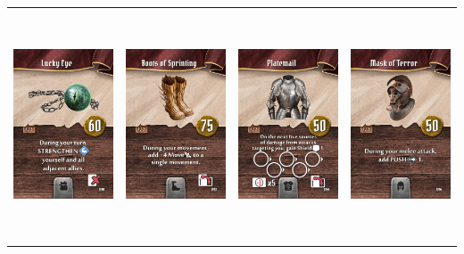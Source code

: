 \documentclass{minimal}
\begin{document}
{\begin{longtable}{llll}
\includegraphics[width=44mm,height=68mm]{./57-63/gh-063-lucky-eye.png} &
\includegraphics[width=44mm,height=68mm]{./64-151/gh-064-boots-of-sprinting.png} &
\includegraphics[width=44mm,height=68mm]{./64-151/gh-065-platemail.png} &
\includegraphics[width=44mm,height=68mm]{./64-151/gh-066-mask-of-terror.png}\\ 

\end{longtable}}
\end{document}
